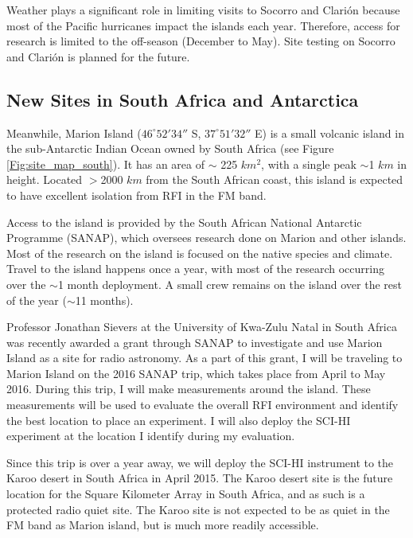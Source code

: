 Weather plays a significant role in limiting visits to Socorro and Clari\'{o}n because most of the Pacific hurricanes impact the islands each year. Therefore, access for research is limited to the off-season (December to May). Site testing on Socorro and Clari\'{o}n is planned for the future.


\subsection{New Sites in South Africa and Antarctica} \label{Sec:SA_site}

Meanwhile, Marion Island ($46^\circ 52' 34''$ S, $37^\circ 51' 32''$ E) is a small volcanic island in the sub-Antarctic Indian Ocean owned by South Africa (see Figure \ref{Fig:site_map_south}). It has an area of $\sim$ 225 $km^2$, with a single peak $\sim$1 $km$ in height. Located $>$2000 $km$ from the South African coast, this island is expected to have excellent isolation from RFI in the FM band. 

Access to the island is provided by the South African National Antarctic Programme (SANAP), which oversees research done on Marion and other islands. Most of the research on the island is focused on the native species and climate. Travel to the island happens once a year, with most of the research occurring over the $\sim$1 month deployment. A small crew remains on the island over the rest of the year ($\sim$11 months). 

Professor Jonathan Sievers at the University of Kwa-Zulu Natal in South Africa was recently awarded a grant through SANAP to investigate and use Marion Island as a site for radio astronomy. As a part of this grant, I will be traveling to Marion Island on the 2016 SANAP trip, which takes place from April to May 2016. During this trip, I will make measurements around the island. These measurements will be used to evaluate the overall RFI environment and identify the best location to place an experiment. I will also deploy the SCI-HI experiment at the location I identify during my evaluation. 

Since this trip is over a year away, we will deploy the SCI-HI instrument to the Karoo desert in South Africa in April 2015. The Karoo desert site is the future location for the Square Kilometer Array \cite{ska} in South Africa, and as such is a protected radio quiet site. The Karoo site is not expected to be as quiet in the FM band as Marion island, but is much more readily accessible.  

